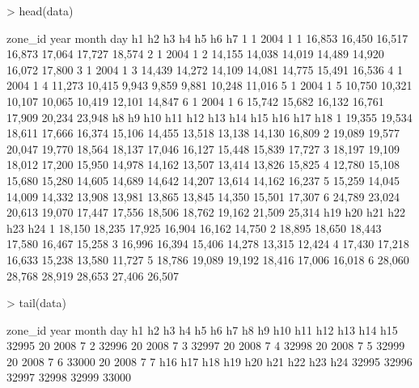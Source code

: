 \documentclass{article}
\begin{document}
\begin{Schunk}
\begin{Sinput}
> head(data)
\end{Sinput}
\begin{Soutput}
  zone_id year month day     h1     h2     h3     h4     h5     h6     h7
1       1 2004     1   1 16,853 16,450 16,517 16,873 17,064 17,727 18,574
2       1 2004     1   2 14,155 14,038 14,019 14,489 14,920 16,072 17,800
3       1 2004     1   3 14,439 14,272 14,109 14,081 14,775 15,491 16,536
4       1 2004     1   4 11,273 10,415  9,943  9,859  9,881 10,248 11,016
5       1 2004     1   5 10,750 10,321 10,107 10,065 10,419 12,101 14,847
6       1 2004     1   6 15,742 15,682 16,132 16,761 17,909 20,234 23,948
      h8     h9    h10    h11    h12    h13    h14    h15    h16    h17    h18
1 19,355 19,534 18,611 17,666 16,374 15,106 14,455 13,518 13,138 14,130 16,809
2 19,089 19,577 20,047 19,770 18,564 18,137 17,046 16,127 15,448 15,839 17,727
3 18,197 19,109 18,012 17,200 15,950 14,978 14,162 13,507 13,414 13,826 15,825
4 12,780 15,108 15,680 15,280 14,605 14,689 14,642 14,207 13,614 14,162 16,237
5 15,259 14,045 14,009 14,332 13,908 13,981 13,865 13,845 14,350 15,501 17,307
6 24,789 23,024 20,613 19,070 17,447 17,556 18,506 18,762 19,162 21,509 25,314
     h19    h20    h21    h22    h23    h24
1 18,150 18,235 17,925 16,904 16,162 14,750
2 18,895 18,650 18,443 17,580 16,467 15,258
3 16,996 16,394 15,406 14,278 13,315 12,424
4 17,430 17,218 16,633 15,238 13,580 11,727
5 18,786 19,089 19,192 18,416 17,006 16,018
6 28,060 28,768 28,919 28,653 27,406 26,507
\end{Soutput}
\begin{Sinput}
> tail(data)
\end{Sinput}
\begin{Soutput}
      zone_id year month day h1 h2 h3 h4 h5 h6 h7 h8 h9 h10 h11 h12 h13 h14 h15
32995      20 2008     7   2                                                   
32996      20 2008     7   3                                                   
32997      20 2008     7   4                                                   
32998      20 2008     7   5                                                   
32999      20 2008     7   6                                                   
33000      20 2008     7   7                                                   
      h16 h17 h18 h19 h20 h21 h22 h23 h24
32995                                    
32996                                    
32997                                    
32998                                    
32999                                    
33000                                    
\end{Soutput}
\end{Schunk}
\end{document}
